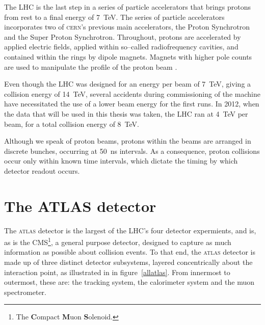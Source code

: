 The LHC is the last step in a series of particle accelerators that brings protons from rest to a final energy of 7~TeV. The series of particle accelerators incorporates two of \textsc{cern}'s previous main accelerators, the Proton Synchrotron and the Super Proton Synchrotron. Throughout, protons are accelerated by applied electric fields, applied within so--called radiofrequency cavities, and contained within the rings by dipole magnets. Magnets with higher pole counts are used to manipulate the profile of the proton beam \cite{peter}.

Even though the LHC was designed for an energy per beam of 7~TeV, giving a collision energy of 14~TeV, several accidents during commissioning of the machine have necessitated the use of a lower beam energy for the first runs. In 2012, when the data that will be used in this thesis was taken, the LHC ran at 4~TeV per beam, for a total collision energy of 8~TeV.

Although we speak of proton beams, protons within the beams are arranged in discrete bunches, occurring at 50~ns intervals. As a consequence, proton collisions occur only within known time intervals, which dictate the timing by which detector readout occurs.

\section{The ATLAS detector}
The \textsc{atlas} detector is the largest of the LHC's four detector expermients, and is, as is the CMS\footnote{The \textbf{C}ompact \textbf{M}uon \textbf{S}olenoid.}, a general purpose detector, designed to capture as much information as possible about collision events. To that end, the \textsc{atlas} detector is made up of three distinct detector subsystems, layered concentrically about the interaction point, as illustrated in in figure~\ref{allatlas}. From innermost to outermost, these are: the tracking system, the calorimeter system and the muon spectrometer.

